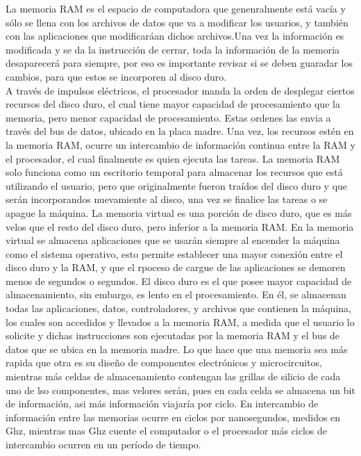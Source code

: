 \documentclass{article}
\begin{document}
La memoria RAM es el espacio de computadora que genenralmente está vacía y sólo se llena con los archivos de datos que va a modificar los usuarios, y también con las aplicaciones que modificaráan dichos archivos.Una vez la información es modificada y se da la instrucción de cerrar, toda la información de la memoria desaparecerá para siempre, por eso es importante revisar si se deben guaradar los cambios, para que estos se incorporen al disco duro. \vspace{5mm} %
\\
A través de impulsos eléctricos, el procesador manda la orden de desplegar ciertos recursos del disco duro, el cual tiene mayor capacidad de procesamiento que la memoria, pero menor capacidad de procesamiento. Estas ordenes las envia a través del bus de datos, ubicado en la placa madre. Una vez, los recursos estén en la memoria RAM, ocurre un intercambio de información continua entre la RAM y el procesador, el cual finalmente es quien ejecuta las tareas. La memoria RAM solo funciona como un escritorio temporal para almacenar los recursos que está utilizando el usuario, pero que originalmente fueron traídos del disco duro y que serán incorporandos nuevamiente al disco, una vez se finalice las tareas o se apague la máquina. \vspace{5mm} %
La memoria virtual es una porción de disco duro, que es más velos que el resto del disco duro, pero inferior a la memoria RAM. En la memoria virtual se almacena aplicaciones que se usarán siempre al encender la máquina como el sistema operativo, esto permite establecer una mayor conexión entre el disco duro y la RAM, y que el rpoceso de cargue de las aplicaciones se demoren menos de segundos o segundos. \vspace{5mm} %
El disco duro es el que posee mayor capacidad de almacenamiento, sin embargo, es lento en el procesamiento. En él, se almacenan todas las aplicaciones, datos, controladores, y archivos que contienen la máquina, los cuales son accedidos y llevados a la memoria RAM, a medida que el usuario lo solicite y dichas instrucciones son ejecutadas por la memoria RAM y el bus de datos que se ubica en la memoria madre. \vspace{5mm} %
Lo que hace que una memoria sea más rapida que otra es su diseño de componentes electrónicos y microcircuitos, mientras más celdas de almacenamiento contengan las grillas de silicio de cada uno de lso componentes, mas velores serán, pues en cada celda se almacena un bit de información, asi más información viajaría por ciclo. En intercambio de información entre las memorias ocurre en ciclos por nanosegundos, medidos en Ghz, mientras mas Ghz cuente el computador o el procesador más ciclos de intercambio ocurren en un período de tiempo.
\end{document}

